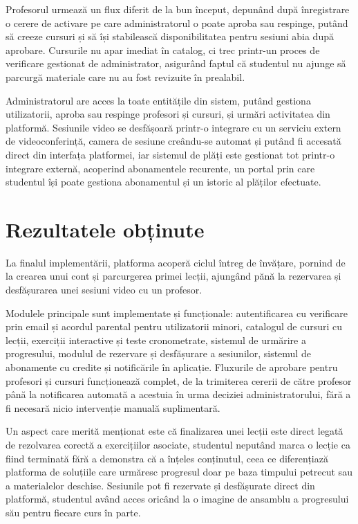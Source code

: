 Profesorul urmează un flux diferit de la bun început, depunând după înregistrare o cerere de activare pe care administratorul o poate aproba sau respinge, putând să creeze cursuri și să își stabilească disponibilitatea pentru sesiuni abia după aprobare. Cursurile nu apar imediat în catalog, ci trec printr-un proces de verificare gestionat de administrator, asigurând faptul că studentul nu ajunge să parcurgă materiale care nu au fost revizuite în prealabil.

Administratorul are acces la toate entitățile din sistem, putând gestiona utilizatorii, aproba sau respinge profesori și cursuri, și urmări activitatea din platformă. Sesiunile video se desfășoară printr-o integrare cu un serviciu extern de videoconferință, camera de sesiune creându-se automat și putând fi accesată direct din interfața platformei, iar sistemul de plăți este gestionat tot printr-o integrare externă, acoperind abonamentele recurente, un portal prin care studentul își poate gestiona abonamentul și un istoric al plăților efectuate.

\section{Rezultatele obținute}
La finalul implementării, platforma acoperă ciclul întreg de învățare, pornind de la crearea unui cont și parcurgerea primei lecții, ajungând pănă la rezervarea și desfășurarea unei sesiuni video cu un profesor.

Modulele principale sunt implementate și funcționale: autentificarea cu verificare prin email și acordul parental pentru utilizatorii minori, catalogul de cursuri cu lecții, exerciții interactive și teste cronometrate, sistemul de urmărire a progresului, modulul de rezervare și desfășurare a sesiunilor, sistemul de abonamente cu credite și notificările în aplicație. Fluxurile de aprobare pentru profesori și cursuri funcționează complet, de la trimiterea cererii de către profesor până la notificarea automată a acestuia în urma deciziei administratorului, fără a fi necesară nicio intervenție manuală suplimentară.

Un aspect care merită menționat este că finalizarea unei lecții este direct legată de rezolvarea corectă a exercițiilor asociate, studentul neputând marca o lecție ca fiind terminată fără a demonstra că a înțeles conținutul, ceea ce diferențiază platforma de soluțiile care urmăresc progresul doar pe baza timpului petrecut sau a materialelor deschise. Sesiunile pot fi rezervate și desfășurate direct din platformă, studentul având acces oricând la o imagine de ansamblu a progresului său pentru fiecare curs în parte.

